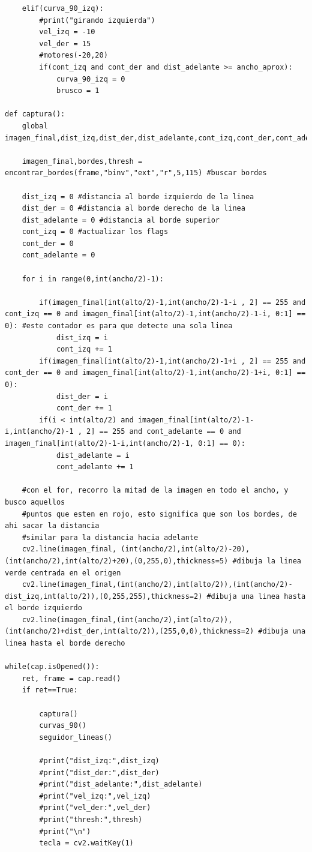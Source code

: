\documentclass[11pt,a4paper]{article}
\begin{document}
\begin{lstlisting}
	elif(curva_90_izq):
		#print("girando izquierda")
		vel_izq = -10
		vel_der = 15
		#motores(-20,20)
		if(cont_izq and cont_der and dist_adelante >= ancho_aprox):
			curva_90_izq = 0
			brusco = 1

def captura():
	global imagen_final,dist_izq,dist_der,dist_adelante,cont_izq,cont_der,cont_adelante,thresh
	
	imagen_final,bordes,thresh = encontrar_bordes(frame,"binv","ext","r",5,115) #buscar bordes
	
	dist_izq = 0 #distancia al borde izquierdo de la linea
	dist_der = 0 #distancia al borde derecho de la linea
	dist_adelante = 0 #distancia al borde superior
	cont_izq = 0 #actualizar los flags
	cont_der = 0
	cont_adelante = 0
	
	for i in range(0,int(ancho/2)-1):
	
		if(imagen_final[int(alto/2)-1,int(ancho/2)-1-i , 2] == 255 and cont_izq == 0 and imagen_final[int(alto/2)-1,int(ancho/2)-1-i, 0:1] == 0): #este contador es para que detecte una sola linea
			dist_izq = i
			cont_izq += 1
		if(imagen_final[int(alto/2)-1,int(ancho/2)-1+i , 2] == 255 and cont_der == 0 and imagen_final[int(alto/2)-1,int(ancho/2)-1+i, 0:1] == 0):
			dist_der = i
			cont_der += 1
		if(i < int(alto/2) and imagen_final[int(alto/2)-1-i,int(ancho/2)-1 , 2] == 255 and cont_adelante == 0 and imagen_final[int(alto/2)-1-i,int(ancho/2)-1, 0:1] == 0):
			dist_adelante = i
			cont_adelante += 1
	
	#con el for, recorro la mitad de la imagen en todo el ancho, y busco aquellos 
	#puntos que esten en rojo, esto significa que son los bordes, de ahi sacar la distancia
	#similar para la distancia hacia adelante
	cv2.line(imagen_final, (int(ancho/2),int(alto/2)-20),(int(ancho/2),int(alto/2)+20),(0,255,0),thickness=5) #dibuja la linea verde centrada en el origen
	cv2.line(imagen_final,(int(ancho/2),int(alto/2)),(int(ancho/2)-dist_izq,int(alto/2)),(0,255,255),thickness=2) #dibuja una linea hasta el borde izquierdo
	cv2.line(imagen_final,(int(ancho/2),int(alto/2)),(int(ancho/2)+dist_der,int(alto/2)),(255,0,0),thickness=2) #dibuja una linea hasta el borde derecho

while(cap.isOpened()):
	ret, frame = cap.read()
	if ret==True: 
	
		captura()
		curvas_90()
		seguidor_lineas()
		
		#print("dist_izq:",dist_izq)
		#print("dist_der:",dist_der)
		#print("dist_adelante:",dist_adelante)
		#print("vel_izq:",vel_izq)
		#print("vel_der:",vel_der)
		#print("thresh:",thresh)
		#print("\n")
		tecla = cv2.waitKey(1)
		

\end{lstlisting}
\end{document}
